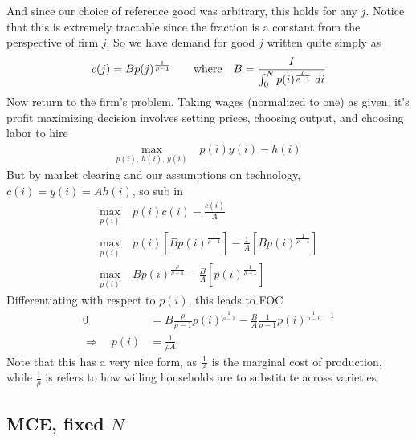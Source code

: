 \documentclass[12pt]{article}
\theoremstyle{plain}
\theoremstyle{definition}
\theoremstyle{remark}
\newcommand{\intzN}{\int_0^N}
\begin{document}
And since our choice of reference good was arbitrary, this holds for any
$j$. Notice that this is extremely tractable since the fraction is a
constant from the perspective of firm $j$. So we have demand for good
$j$ written quite simply as
\begin{align*}
  c(j) = B p(j)^{\frac{1}{\rho-1}}
  \qquad\text{where} \quad B=
  \frac{I}{\intzN p(i)^{\frac{\rho}{\rho-1}} \notag \; di}
\end{align*}
Now return to the firm's problem. Taking wages (normalized to one) as
given, it's profit maximizing decision involves setting prices, choosing
output, and choosing labor to hire
\begin{align*}
  \max_{p(i), \,h(i), \,y(i)} \; &p(i) y(i) - h(i)
\end{align*}
But by market clearing and our assumptions on technology,
$c(i)=y(i)=Ah(i)$, so sub in
\begin{align*}
  \max_{p(i)} \; &p(i) c(i) - \frac{c(i)}{A} \\
  \max_{p(i)}
  \; &p(i) \left[B p(i)^{\frac{1}{\rho-1}}\right]
    - \frac{1}{A} \left[B p(i)^{\frac{1}{\rho-1}}\right] \\
  \max_{p(i)}
  \; & B p(i)^{\frac{\rho}{\rho-1}}
    - \frac{B}{A} \left[p(i)^{\frac{1}{\rho-1}}\right]
\end{align*}
Differentiating with respect to $p(i)$, this leads to FOC
\begin{align*}
  0&=
  B {\frac{\rho}{\rho-1}} p(i)^{\frac{1}{\rho-1}}
    - \frac{B}{A} \frac{1}{\rho-1}p(i)^{\frac{1}{\rho-1}-1} \\
  \Rightarrow\quad
  p(i) &= \frac{1}{\rho A}
\end{align*}
Note that this has a very nice form, as $\frac{1}{A}$ is the marginal
cost of production, while $\frac{1}{\rho}$ is refers to how willing
households are to substitute across varieties.


\subsection{MCE, fixed $N$}
\end{document}
